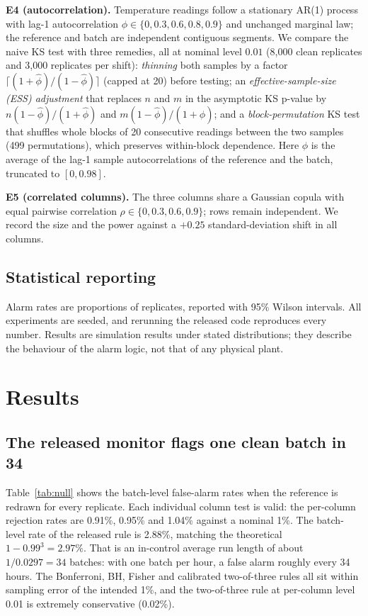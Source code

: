 \documentclass[11pt]{article}
\begin{document}
\textbf{E4 (autocorrelation).} Temperature readings follow a stationary AR(1) process with lag-1 autocorrelation $\phi\in\{0,0.3,0.6,0.8,0.9\}$ and unchanged marginal law; the reference and batch are independent contiguous segments. We compare the naive KS test with three remedies, all at nominal level $0.01$ (8{,}000 clean replicates and 3{,}000 replicates per shift): \emph{thinning} both samples by a factor $\lceil(1+\hat\phi)/(1-\hat\phi)\rceil$ (capped at 20) before testing; an \emph{effective-sample-size (ESS) adjustment} that replaces $n$ and $m$ in the asymptotic KS p-value by $n(1-\hat\phi)/(1+\hat\phi)$ and $m(1-\hat\phi)/(1+\hat\phi)$; and a \emph{block-permutation} KS test that shuffles whole blocks of 20 consecutive readings between the two samples (499 permutations), which preserves within-block dependence. Here $\hat\phi$ is the average of the lag-1 sample autocorrelations of the reference and the batch, truncated to $[0,0.98]$.

\textbf{E5 (correlated columns).} The three columns share a Gaussian copula with equal pairwise correlation $\rho\in\{0,0.3,0.6,0.9\}$; rows remain independent. We record the size and the power against a $+0.25$ standard-deviation shift in all columns.

\subsection{Statistical reporting}

Alarm rates are proportions of replicates, reported with 95\% Wilson intervals. All experiments are seeded, and rerunning the released code reproduces every number. Results are simulation results under stated distributions; they describe the behaviour of the alarm logic, not that of any physical plant.

\section{Results}
\label{sec:results}

\subsection{The released monitor flags one clean batch in 34}

Table~\ref{tab:null} shows the batch-level false-alarm rates when the reference is redrawn for every replicate. Each individual column test is valid: the per-column rejection rates are 0.91\%, 0.95\% and 1.04\% against a nominal 1\%. The batch-level rate of the released rule is 2.88\%, matching the theoretical $1-0.99^3=2.97\%$. That is an in-control average run length of about $1/0.0297=34$ batches: with one batch per hour, a false alarm roughly every 34 hours. The Bonferroni, BH, Fisher and calibrated two-of-three rules all sit within sampling error of the intended 1\%, and the two-of-three rule at per-column level 0.01 is extremely conservative (0.02\%).
\end{document}
